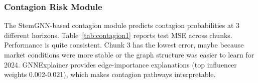 \documentclass[conference]{IEEEtran}
\begin{document}
\subsubsection{Contagion Risk Module}
The StemGNN-based contagion module predicts contagion probabilities at 3 different horizons. Table~\ref{tab:contagion1} reports test MSE across chunks. Performance is quite consistent. Chunk 3 has the lowest error, maybe because market conditions were more stable or the graph structure was easier to learn for 2024. GNNExplainer provides edge-importance explanations (top influencer weights 0.002-0.021), which makes contagion pathways interpretable.
\end{document}
